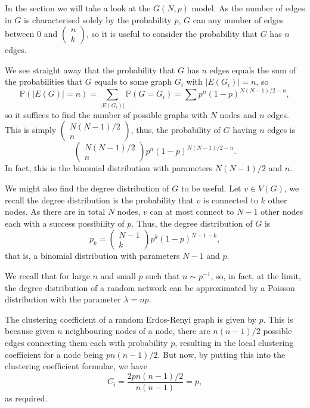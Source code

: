 \documentclass[
]{article}
\theoremstyle{definition}
\begin{document}
In the section we will take a look at the \(G(N, p)\) model. As the
number of edges in \(G\) is characterised solely by the probability
\(p\), \(G\) can any number of edges between 0 and
\(\begin{pmatrix} n \\ k \end{pmatrix}\), so it is useful to consider
the probability that \(G\) has \(n\) edges.

We see straight away that the probability that \(G\) has \(n\) edges
equals the sum of the probabilities that \(G\) equals to some graph
\(G_i\) with \(\left| E(G_i) \right| = n\), so
\[\mathbb{P}(\left| E(G) \right| = n) = \sum_{\left| E(G_i) \right|}\mathbb{P}(G = G_i)
  = \sum p^n (1 - p)^{N (N - 1) / 2 - n},\] so it suffices to find the
number of possible graphs with \(N\) nodes and \(n\) edges. This is
simply \(\begin{pmatrix} N (N - 1) / 2 \\ n \end{pmatrix}\), thus, the
probability of \(G\) having \(n\) edges is
\[\begin{pmatrix} N (N - 1) / 2 \\ n \end{pmatrix}p^n (1 - p)^{N (N - 1) / 2 - n}.\]
In fact, this is the binomial distribution with parameters
\(N (N - 1) / 2\) and \(n\).

We might also find the degree distribution of \(G\) to be useful. Let
\(v \in V(G)\), we recall the degree distribution is the probability
that \(v\) is connected to \(k\) other nodes. As there are in total
\(N\) nodes, \(v\) can at most connect to \(N - 1\) other nodes each
with a success possibility of \(p\). Thus, the degree distribution of
\(G\) is
\[p_k = \begin{pmatrix} N - 1 \\ k \end{pmatrix} p^k (1 - p)^{N - 1 - k}, \]
that is, a binomial distribution with parameters \(N - 1\) and \(p\).

We recall that for large \(n\) and small \(p\) such that
\(n \sim p^{-1}\), so, in fact, at the limit, the degree distribution of
a random network can be approximated by a Poisson distribution with the
parameter \(\lambda = np\).

The clustering coefficient of a random Erdos-Renyi graph is given by
\(p\). This is because given \(n\) neighbouring nodes of a node, there
are \(n (n - 1) / 2\) possible edges connecting them each with
probability \(p\), resulting in the local clustering coefficient for a
node being \(p n (n - 1) / 2\). But now, by putting this into the
clustering coefficient formulae, we have
\[C_i = \frac{2 p n (n - 1) / 2}{n (n - 1)} = p,\] as required.
\end{document}
